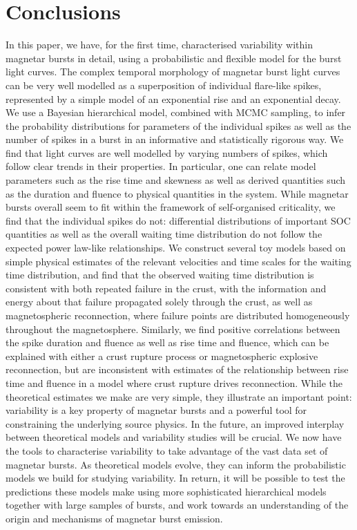 \documentclass[12pt]{emulateapj}
\begin{document}
\section{Conclusions}

In this paper, we have, for the first time, characterised variability within magnetar bursts in detail, using a probabilistic and flexible model for the burst light curves.
The complex temporal morphology of magnetar burst light curves can be very well modelled as a superposition of individual flare-like spikes, represented by a simple
model of an exponential rise and an exponential decay. We use a Bayesian hierarchical model, combined with MCMC sampling, to infer the probability distributions for
parameters of the individual spikes as well as the number of spikes in a burst in an informative and statistically rigorous way. 
We find that light curves are well modelled by varying numbers of spikes, which follow clear trends in their properties. In particular, one can relate model parameters such as the 
rise time and skewness as well as derived quantities such as the duration and fluence to physical quantities in the system. 
While magnetar bursts overall seem to fit within the framework of self-organised criticality, we find that the individual spikes do not: differential distributions of important SOC 
quantities as well as the overall waiting time distribution do not follow the expected power law-like relationships.
We construct several toy models based on simple physical estimates of the relevant velocities and time scales for the waiting time distribution, and find that the observed waiting time distribution is 
consistent with both repeated failure in the crust, with the information and energy about that failure propagated solely through the crust, as well as magnetospheric reconnection, where
failure points are distributed homogeneously throughout the magnetosphere. Similarly, we find positive correlations between the spike duration and fluence as well as rise time and fluence, 
which can be explained with either a crust rupture process or magnetospheric explosive reconnection, but are inconsistent with estimates of the relationship between rise time and fluence in a model where
crust rupture drives reconnection. 
While the theoretical estimates we make are very simple, they illustrate an important point: variability is a key property of magnetar bursts and a powerful tool for constraining the
underlying source physics. In the future, an improved interplay between theoretical models and variability studies will be crucial. We now have the tools to characterise variability to take advantage of 
the vast data set of magnetar bursts. As theoretical 
models evolve, they can inform the probabilistic models we build for studying variability. In return, it will be possible to test the predictions these models make using more sophisticated hierarchical models together with large samples of bursts,  and work towards an understanding of the origin and mechanisms of magnetar burst emission.
\end{document}
